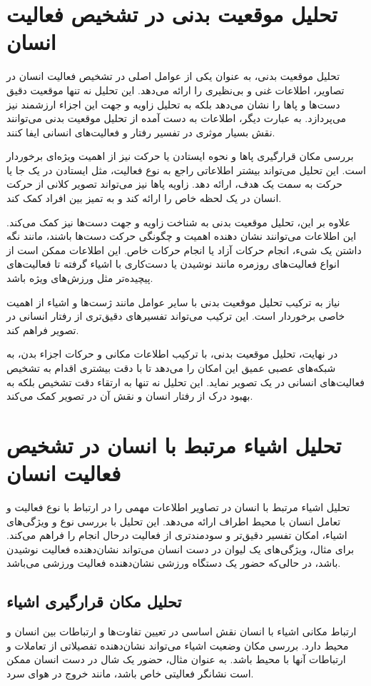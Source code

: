\section{تحلیل موقعیت بدنی در تشخیص فعالیت انسان} 

تحلیل موقعیت بدنی، به عنوان یکی از عوامل اصلی در تشخیص فعالیت انسان در تصاویر، اطلاعات غنی و بی‌نظیری را ارائه می‌دهد. این تحلیل نه تنها موقعیت دقیق دست‌ها و پاها را نشان می‌دهد بلکه به تحلیل زاویه و جهت این اجزاء ارزشمند نیز می‌پردازد. به عبارت دیگر، اطلاعات به دست آمده از تحلیل موقعیت بدنی می‌توانند نقش بسیار موثری در تفسیر رفتار و فعالیت‌های انسانی ایفا کنند.

بررسی مکان قرارگیری پاها و نحوه ایستادن یا حرکت نیز از اهمیت ویژه‌ای برخوردار است. این تحلیل می‌تواند بیشتر اطلاعاتی راجع به نوع فعالیت، مثل ایستادن در یک جا یا حرکت به سمت یک هدف، ارائه دهد. زاویه پاها نیز می‌تواند تصویر کلانی از حرکت انسان در یک لحظه خاص را ارائه کند و به تمیز بین افراد کمک کند.

علاوه بر این، تحلیل موقعیت بدنی به شناخت زاویه و جهت دست‌ها نیز کمک می‌کند. این اطلاعات می‌توانند نشان دهنده اهمیت و چگونگی حرکت دست‌ها باشند، مانند نگه داشتن یک شیء، انجام حرکات آزاد یا انجام حرکات خاص. این اطلاعات ممکن است از انواع فعالیت‌های روزمره مانند نوشیدن یا دست‌کاری با اشیاء گرفته تا فعالیت‌های پیچیده‌تر مثل ورزش‌های ویژه باشد.

نیاز به ترکیب تحلیل موقعیت بدنی با سایر عوامل مانند ژست‌ها و اشیاء از اهمیت خاصی برخوردار است. این ترکیب می‌تواند تفسیرهای دقیق‌تری از رفتار انسانی در تصویر فراهم کند.

در نهایت، تحلیل موقعیت بدنی، با ترکیب اطلاعات مکانی و حرکات اجزاء بدن، به شبکه‌های عصبی عمیق این امکان را می‌دهد تا با دقت بیشتری اقدام به تشخیص فعالیت‌های انسانی در یک تصویر نماید. این تحلیل نه تنها به ارتقاء دقت تشخیص بلکه به بهبود درک از رفتار انسان و نقش آن در تصویر کمک می‌کند.
\section{تحلیل اشیاء مرتبط با انسان در تشخیص فعالیت انسان}
تحلیل اشیاء مرتبط با انسان در تصاویر اطلاعات مهمی را در ارتباط با نوع فعالیت و تعامل انسان با محیط اطراف ارائه می‌دهد. این تحلیل با بررسی نوع و ویژگی‌های اشیاء، امکان تفسیر دقیق‌تر و سودمندتری از فعالیت درحال‌ انجام را فراهم می‌کند. برای مثال، ویژگی‌های یک لیوان در دست انسان می‌تواند نشان‌دهنده فعالیت نوشیدن باشد، در حالی‌که حضور یک دستگاه ورزشی نشان‌دهنده فعالیت ورزشی می‌باشد.
\subsection{تحلیل مکان قرارگیری اشیاء}
ارتباط مکانی اشیاء با انسان نقش اساسی در تعیین تفاوت‌ها و ارتباطات بین انسان و محیط دارد. بررسی مکان وضعیت اشیاء می‌تواند نشان‌دهنده تفصیلاتی از تعاملات و ارتباطات آنها با محیط باشد. به عنوان مثال، حضور یک شال در دست انسان ممکن است نشانگر فعالیتی خاص باشد، مانند خروج در هوای سرد.
